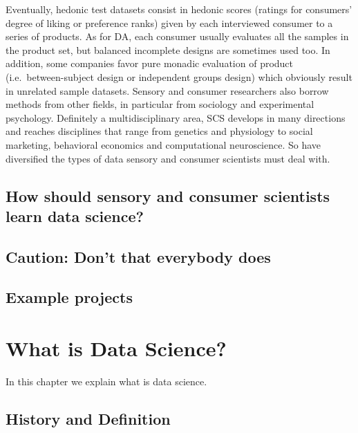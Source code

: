 \documentclass[
]{book}
\begin{document}
Eventually, hedonic test datasets consist in hedonic scores (ratings for consumers' degree of liking or preference ranks) given by each interviewed consumer to a series of products. As for DA, each consumer usually evaluates all the samples in the product set, but balanced incomplete designs are sometimes used too. In addition, some companies favor pure monadic evaluation of product (i.e.~between-subject design or independent groups design) which obviously result in unrelated sample datasets.
Sensory and consumer researchers also borrow methods from other fields, in particular from sociology and experimental psychology. Definitely a multidisciplinary area, SCS develops in many directions and reaches disciplines that range from genetics and physiology to social marketing, behavioral economics and computational neuroscience. So have diversified the types of data sensory and consumer scientists must deal with.

\hypertarget{how-should-sensory-and-consumer-scientists-learn-data-science}{%
\section{How should sensory and consumer scientists learn data science?}\label{how-should-sensory-and-consumer-scientists-learn-data-science}}

\hypertarget{caution-dont-that-everybody-does}{%
\section{Caution: Don't that everybody does}\label{caution-dont-that-everybody-does}}

\hypertarget{example-projects}{%
\section{Example projects}\label{example-projects}}

\hypertarget{data_science}{%
\chapter{What is Data Science?}\label{data_science}}

In this chapter we explain what is data science.

\hypertarget{history-and-definition}{%
\section{History and Definition}\label{history-and-definition}}
\end{document}
